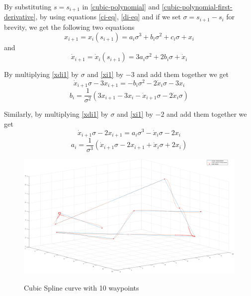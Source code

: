 By substituting $s = s_{i+1}$ in \ref{cubic-polynomial} and \ref{cubic-polynomial-first-derivative}, by using equations \ref{ci-eq}, \ref{di-eq} and if 
we set $σ = s_{i+1}-s_i$ for brevity, we get the following two equations
\begin{equation}
\label{xi1}
x_{i+1} = x_i(s_{i+1}) = a_i σ^3 + b_i σ^2 + c_i σ + x_i
\end{equation}
and
\begin{equation}
\label{xdi1}
\dot{x}_{i+1} = \dot{x}_i(s_{i+1}) = 3a_i σ^2 + 2b_i σ + \dot{x}_i
\end{equation}

By multiplying \ref{xdi1} by $σ$ and \ref{xi1} by $-3$ and add them together we get
\[
\dot{x}_{i+1}σ - 3x_{i+1} = -b_iσ^2 -2\dot{x}_iσ - 3x_i
\]
\begin{equation}
b_i = \frac{1}{σ^2} (3x_{i+1} -3x_i - \dot{x}_{i+1}σ - 2\dot{x}_iσ)
\end{equation}

Similarly, by multiplying \ref{xdi1} by $σ$ and \ref{xi1} by $-2$ and add them together we get
\[
\dot{x}_{i+1}σ - 2x_{i+1} = a_iσ^3 -\dot{x}_iσ - 2x_i
\]
\begin{equation}
a_i = \frac{1}{σ^3} (\dot{x}_{i+1}σ - 2x_{i+1} + \dot{x}_iσ +2x_i)
\end{equation}

\begin{center}
\begin{figure}[!htb]
\centering
\includegraphics[width=\textwidth]{images/cubic-spline-path1.png}\\
\caption{Cubic Spline curve with 10 waypoints} 
\label{cubic-spline-explanation}
\end{figure}
\end{center}


